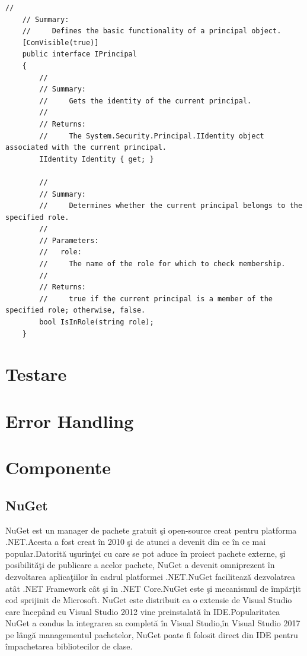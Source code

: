 \documentclass[a4paper,12pt]{report}
\begin{document}
\begin{lstlisting}[caption={Interfa\c ta IPrincipal},label={lst:IPrincipal},breaklines]
    //
    // Summary:
    //     Defines the basic functionality of a principal object.
    [ComVisible(true)]
    public interface IPrincipal
    {
        //
        // Summary:
        //     Gets the identity of the current principal.
        //
        // Returns:
        //     The System.Security.Principal.IIdentity object associated with the current principal.
        IIdentity Identity { get; }

        //
        // Summary:
        //     Determines whether the current principal belongs to the specified role.
        //
        // Parameters:
        //   role:
        //     The name of the role for which to check membership.
        //
        // Returns:
        //     true if the current principal is a member of the specified role; otherwise, false.
        bool IsInRole(string role);
    }
\end{lstlisting}

\section{Testare}

\section{Error Handling}

\section{Componente}

\subsection{NuGet}

NuGet est un manager de pachete gratuit \c si open-source creat pentru platforma .NET.Acesta a fost creat \^in 2010
\c si de atunci a devenit din ce \^in ce mai popular.Datorit\u a u\c surin\c tei cu care se pot aduce \^in proiect 
pachete externe, \c si posibilit\u a\c ti de publicare a acelor pachete, NuGet a devenit omniprezent \^in 
dezvoltarea aplica\c tiilor \^in cadrul platformei .NET.NuGet faciliteaz\u a dezvolatrea at\^at .NET Framework
c\^at \c si \^in .NET Core.NuGet este \c si mecanismul de \^imp\u ar\c tit cod sprijinit de Microsoft.
NuGet este distribuit ca o extensie de Visual Studio care \^incep\^and cu Visual Studio 2012 vine preinstalat\u a
\^in IDE.Popularitatea NuGet a condus la integrarea sa complet\u a \^in Visual Studio,\^in Visual Studio 2017 pe 
l\^ang\u a managementul pachetelor, NuGet poate fi folosit direct din IDE pentru \^impachetarea bibliotecilor
de clase.
\end{document}
